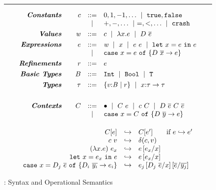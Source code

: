 \begin{figure}
\hrule width 0.48\textwidth \vspace{0.05in}
$$
\begin{array}{rrcl}

\emphbf{Constants} \quad 
  & c & ::=    & 0,1,-1,\ldots \spmid \etrue, \efalse \\
  &   & \spmid & +,-,\ldots \spmid =, <, \ldots \spmid \ecrash 
  \\[0.05in]

\emphbf{Values} \quad 
  & \val & ::= &  c \spmid \efun{x}{\typ}{e} \spmid \edapp{D}{e}
  \\[0.05in] 

\emphbf{Expressions} \quad 
  & e & ::=    & \val \spmid x \spmid \eapp{e}{e} \spmid \elet{x}{e}{e} \\ 
  &   & \spmid & \ecase{e}{D}{\overline{x}}{e}{x} \\[0.05in] 

\emphbf{Refinements} \quad 
  & r & ::= &   e \\[0.05in] 

\emphbf{Basic Types} \quad 
  & \tbase & ::= & \tint \spmid \tbool \spmid \ttct \\[0.05in] 

\emphbf{Types} \quad 
  & \typ & ::= & \tref{v}{\Base}{}{r} \spmid \tfunref{x}{\typ}{\typ}{v}{e} \\[0.1in]
\end{array}
$$

$$
\begin{array}{rrcl}
\emphbf{Contexts} \quad 
  & C
  & ::= 
  &   	 \bullet 
  \spmid \eapp{C}{e} 
  \spmid \eapp{c}{C} 
  \spmid D\ \overline{e}\ C\ \overline{e}\\
  &&\spmid &
  \ecase{C}{D}{\overline{y}}{e}{x}
  \\[0.05in] 
\end{array}
$$


$$
\begin{array}{rcl}
\eval{C[e]&}{&C[e']} \qquad \text{if}\ \eval{e}{e'} \\
	\eval{\eapp{c}{v}&}{& \ceval{c}{v}}\\
\eval{\eapp{(\efun{x}{\tau_x}{e})}{e_x}&}{&e\sub{x}{e_x}}\\
	\eval{\elet{x}{e_x}{e}&}{&e\sub{x}{e_x}} \\
	\eval{\ecase{D_j\ \overline{e}}{D_i}{\overline{y_i}}{e_i}{x}&}
	{&e_j\sub{x}{D_j\ \overline{e}}\sub{\overline{y_j}}{\overline{e}}} \\
\end{array}
$$

\caption{\undeclang: Syntax and Operational Semantics}
\label{fig:undeclang}
\label{fig:operational}
\end{figure}
